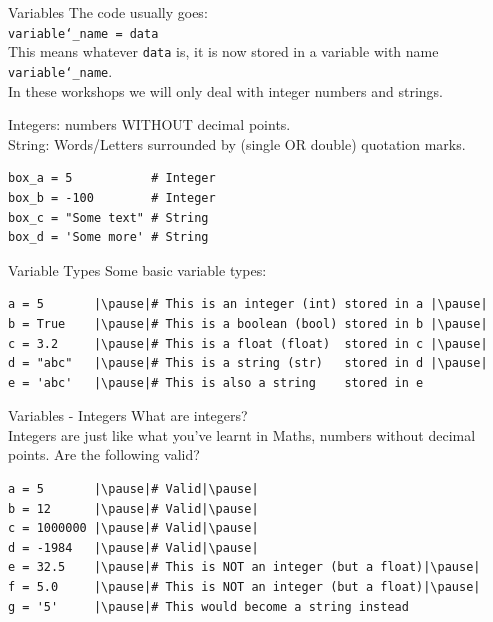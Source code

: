 \documentclass[dvipsnames, svgnames, x11names]{beamer}
\begin{document}
\begin{frame}[fragile]{Variables}
The code usually goes:\\
\texttt{variable\char`\_name = data}\\
This means whatever \texttt{data} is, it is now stored in a variable with name \texttt{variable\char`\_name}.
\vspace{1em}\\
In these workshops we will only deal with integer numbers and strings.

Integers: numbers WITHOUT decimal points.\\
String: Words/Letters surrounded by (single OR double) quotation marks.

\begin{verbatim}
box_a = 5           # Integer
box_b = -100        # Integer
box_c = "Some text" # String
box_d = 'Some more' # String
\end{verbatim}
\end{frame}

\begin{frame}[fragile]{Variable Types}
Some basic variable types:
\begin{verbatim}
a = 5       |\pause|# This is an integer (int) stored in a |\pause|
b = True    |\pause|# This is a boolean (bool) stored in b |\pause|
c = 3.2     |\pause|# This is a float (float)  stored in c |\pause|
d = "abc"   |\pause|# This is a string (str)   stored in d |\pause|
e = 'abc'   |\pause|# This is also a string    stored in e
\end{verbatim}
\end{frame}

\begin{frame}[fragile]{Variables - Integers}
What are integers?\pause\\
Integers are just like what you've learnt in Maths, numbers without decimal points. Are the following valid?\pause
\begin{verbatim}
a = 5       |\pause|# Valid|\pause|
b = 12      |\pause|# Valid|\pause|
c = 1000000 |\pause|# Valid|\pause|
d = -1984   |\pause|# Valid|\pause|
e = 32.5    |\pause|# This is NOT an integer (but a float)|\pause|
f = 5.0     |\pause|# This is NOT an integer (but a float)|\pause|
g = '5'     |\pause|# This would become a string instead
\end{verbatim}
\end{frame}
\end{document}
